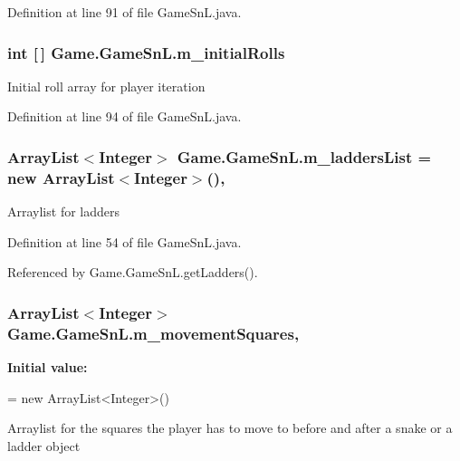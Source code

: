 Definition at line 91 of file Game\+Sn\+L.\+java.

\hypertarget{class_game_1_1_game_sn_l_a005ffc3118d467caff14a7afdc68a520}{}
\subsubsection[{m\+\_\+initial\+Rolls}]{\setlength{\rightskip}{0pt plus 5cm}int \mbox{[}$\,$\mbox{]} Game.\+Game\+Sn\+L.\+m\+\_\+initial\+Rolls\hspace{0.3cm}{\ttfamily [private]}}\label{class_game_1_1_game_sn_l_a005ffc3118d467caff14a7afdc68a520}
Initial roll array for player iteration 

Definition at line 94 of file Game\+Sn\+L.\+java.

\hypertarget{class_game_1_1_game_sn_l_a0b47e32e0960ed988d341b31b5f3bd3b}{}
\subsubsection[{m\+\_\+ladders\+List}]{\setlength{\rightskip}{0pt plus 5cm}Array\+List$<$Integer$>$ Game.\+Game\+Sn\+L.\+m\+\_\+ladders\+List = new Array\+List$<$Integer$>$()\hspace{0.3cm}{\ttfamily [static]}, {\ttfamily [private]}}\label{class_game_1_1_game_sn_l_a0b47e32e0960ed988d341b31b5f3bd3b}
Arraylist for ladders 

Definition at line 54 of file Game\+Sn\+L.\+java.



Referenced by Game.\+Game\+Sn\+L.\+get\+Ladders().

\hypertarget{class_game_1_1_game_sn_l_af8c7ff07d44c8713db098772d7888478}{}
\subsubsection[{m\+\_\+movement\+Squares}]{\setlength{\rightskip}{0pt plus 5cm}Array\+List$<$Integer$>$ Game.\+Game\+Sn\+L.\+m\+\_\+movement\+Squares\hspace{0.3cm}{\ttfamily [static]}, {\ttfamily [private]}}\label{class_game_1_1_game_sn_l_af8c7ff07d44c8713db098772d7888478}
{\bfseries Initial value\+:}
\begin{DoxyCode}
= 
            \textcolor{keyword}{new} ArrayList<Integer>()
\end{DoxyCode}
Arraylist for the squares the player has to move to before and after a snake or a ladder object 

